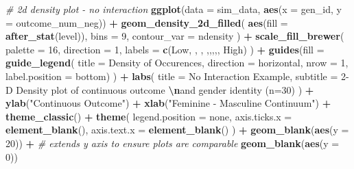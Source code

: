 \documentclass[
]{book}
\newenvironment{Shaded}{\begin{snugshade}}{\end{snugshade}}
\newcommand{\AttributeTok}[1]{\textcolor[rgb]{0.13,0.29,0.53}{#1}}
\newcommand{\CommentTok}[1]{\textcolor[rgb]{0.56,0.35,0.01}{\textit{#1}}}
\newcommand{\DecValTok}[1]{\textcolor[rgb]{0.00,0.00,0.81}{#1}}
\newcommand{\FunctionTok}[1]{\textcolor[rgb]{0.13,0.29,0.53}{\textbf{#1}}}
\newcommand{\NormalTok}[1]{#1}
\newcommand{\SpecialCharTok}[1]{\textcolor[rgb]{0.81,0.36,0.00}{\textbf{#1}}}
\newcommand{\StringTok}[1]{\textcolor[rgb]{0.31,0.60,0.02}{#1}}
\begin{document}
\begin{Shaded}
\begin{Highlighting}[]
\CommentTok{\# 2d density plot {-} no interaction}
\FunctionTok{ggplot}\NormalTok{(}\AttributeTok{data =}\NormalTok{ sim\_data, }\FunctionTok{aes}\NormalTok{(}\AttributeTok{x =}\NormalTok{ gen\_id, }\AttributeTok{y =}\NormalTok{ outcome\_num\_neg)) }\SpecialCharTok{+} 
  \FunctionTok{geom\_density\_2d\_filled}\NormalTok{(}
    \FunctionTok{aes}\NormalTok{(}\AttributeTok{fill =} \FunctionTok{after\_stat}\NormalTok{(level)), }\AttributeTok{bins =} \DecValTok{9}\NormalTok{, }\AttributeTok{contour\_var =} \StringTok{\textquotesingle{}ndensity\textquotesingle{}}
\NormalTok{    ) }\SpecialCharTok{+}
  \FunctionTok{scale\_fill\_brewer}\NormalTok{(}
    \AttributeTok{palette =} \DecValTok{16}\NormalTok{, }\AttributeTok{direction =} \DecValTok{1}\NormalTok{, }
    \AttributeTok{labels =} \FunctionTok{c}\NormalTok{(}\StringTok{\textquotesingle{}Low\textquotesingle{}}\NormalTok{, }\StringTok{\textquotesingle{}\textquotesingle{}}\NormalTok{, }\StringTok{\textquotesingle{}\textquotesingle{}}\NormalTok{, }\StringTok{\textquotesingle{}\textquotesingle{}}\NormalTok{,}\StringTok{\textquotesingle{}\textquotesingle{}}\NormalTok{,}\StringTok{\textquotesingle{}\textquotesingle{}}\NormalTok{,}\StringTok{\textquotesingle{}\textquotesingle{}}\NormalTok{,}\StringTok{\textquotesingle{}\textquotesingle{}}\NormalTok{, }\StringTok{\textquotesingle{}High\textquotesingle{}}\NormalTok{)}
\NormalTok{    ) }\SpecialCharTok{+}
  \FunctionTok{guides}\NormalTok{(}\AttributeTok{fill =} \FunctionTok{guide\_legend}\NormalTok{(}
    \AttributeTok{title =} \StringTok{\textquotesingle{}Density of Occurences\textquotesingle{}}\NormalTok{, }
    \AttributeTok{direction =} \StringTok{\textquotesingle{}horizontal\textquotesingle{}}\NormalTok{, }\AttributeTok{nrow =} \DecValTok{1}\NormalTok{, }
    \AttributeTok{label.position =} \StringTok{\textquotesingle{}bottom\textquotesingle{}}\NormalTok{)}
\NormalTok{    ) }\SpecialCharTok{+}
  \FunctionTok{labs}\NormalTok{(}
    \AttributeTok{title =} \StringTok{\textquotesingle{}No Interaction Example\textquotesingle{}}\NormalTok{,}
    \AttributeTok{subtitle =} \StringTok{\textquotesingle{}2{-}D Density plot of continuous outcome }\SpecialCharTok{\textbackslash{}n}\StringTok{and gender identity (n=30)\textquotesingle{}}
\NormalTok{    ) }\SpecialCharTok{+}
  \FunctionTok{ylab}\NormalTok{(}\StringTok{"Continuous Outcome"}\NormalTok{) }\SpecialCharTok{+} \FunctionTok{xlab}\NormalTok{(}\StringTok{"Feminine {-} Masculine Continuum"}\NormalTok{) }\SpecialCharTok{+}
  \FunctionTok{theme\_classic}\NormalTok{() }\SpecialCharTok{+}
  \FunctionTok{theme}\NormalTok{(}
    \AttributeTok{legend.position =} \StringTok{\textquotesingle{}none\textquotesingle{}}\NormalTok{,}
    \AttributeTok{axis.ticks.x =} \FunctionTok{element\_blank}\NormalTok{(),}
    \AttributeTok{axis.text.x =} \FunctionTok{element\_blank}\NormalTok{()}
\NormalTok{  ) }\SpecialCharTok{+}
  \FunctionTok{geom\_blank}\NormalTok{(}\FunctionTok{aes}\NormalTok{(}\AttributeTok{y =} \DecValTok{20}\NormalTok{)) }\SpecialCharTok{+} \CommentTok{\# extends y axis to ensure plots are comparable}
  \FunctionTok{geom\_blank}\NormalTok{(}\FunctionTok{aes}\NormalTok{(}\AttributeTok{y =} \DecValTok{0}\NormalTok{))}
\end{Highlighting}
\end{Shaded}
\end{document}
